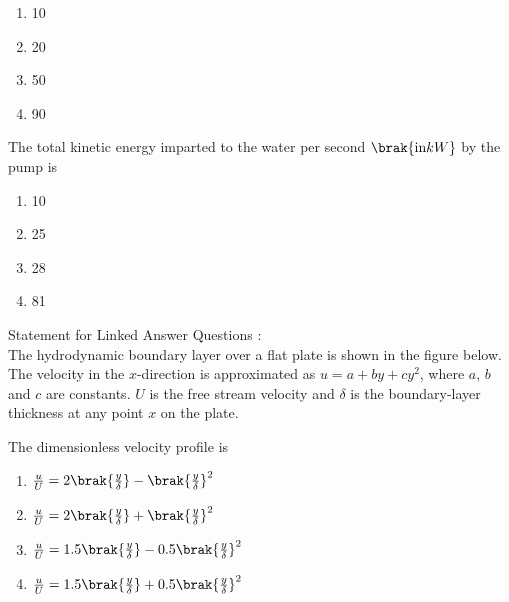 \begin{enumerate}
    \item 10
    \item 20
    \item 50
    \item 90
\end{enumerate}
\item The total kinetic energy imparted to the water per second $\brak{\text{in} kW}$ by the pump is
\begin{enumerate}
    \item 10
    \item 25
    \item 28
    \item 81
\end{enumerate}
Statement for Linked Answer Questions :\\
The hydrodynamic boundary layer over a flat plate is shown in the figure below. The velocity in the $x$-direction is approximated as $u = a + by + cy^2$, where $a$, $b$ and $c$ are constants. $U$ is the free stream velocity and $\delta$ is the boundary-layer thickness at any point $x$ on the plate.
\item The dimensionless velocity profile is
\begin{enumerate}
    \item $\frac{u}{U} = 2\brak{\frac{y}{\delta}}-\brak{\frac{y}{\delta}}^2$       
    \item $\frac{u}{U} = 2\brak{\frac{y}{\delta}}+\brak{\frac{y}{\delta}}^2$        
    \item $\frac{u}{U} = 1.5\brak{\frac{y}{\delta}}-0.5\brak{\frac{y}{\delta}}^2$        
    \item $\frac{u}{U} = 1.5\brak{\frac{y}{\delta}}+0.5\brak{\frac{y}{\delta}}^2$
\end{enumerate}
